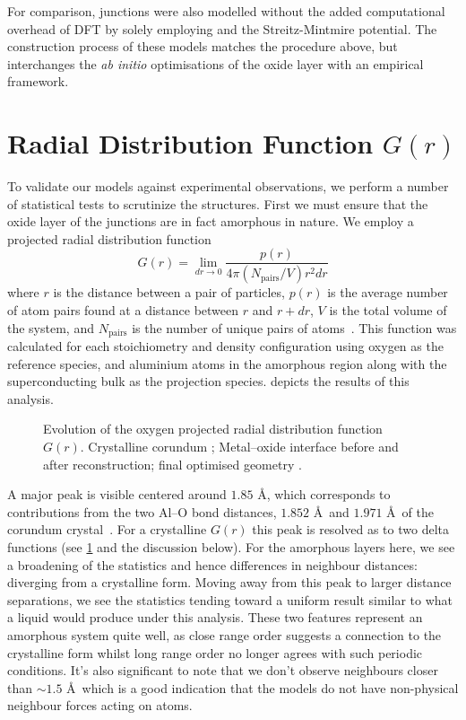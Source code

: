 For comparison, junctions were also modelled without the added computational overhead of DFT by solely employing  and the Streitz-Mintmire potential.
The construction process of these models matches the procedure above, but interchanges the \textit{ab initio} optimisations of the oxide layer with an empirical framework.

\section{Radial Distribution Function \texorpdfstring{$G(r)$}{G(r)}}\label{sec:gr}
To validate our models against experimental observations, we perform a number of statistical tests to scrutinize the structures.
First we must ensure that the oxide layer of the junctions are in fact amorphous in nature.
We employ a projected radial distribution function
\begin{equation}
G(r) = \lim_{dr \to 0}\frac{p(r)}{4\pi\left(N_{\mathrm{pairs}}/V\right)r^2dr}
\end{equation}
where $r$ is the distance between a pair of particles, $p(r)$ is the average number of atom pairs found at a distance between $r$ and $r + dr$, $V$ is the total volume of the system, and $N_{\mathrm{pairs}}$ is the number of unique pairs of atoms~\cite{Levine2011}.
This function was calculated for each stoichiometry and density configuration using oxygen as the reference species, and aluminium atoms in the amorphous region along with the superconducting bulk as the projection species.  depicts the results of this analysis.

\begin{figure}[htp]
\resizebox{0.8\textwidth}{!}{}
\caption[Radial Distribution Function]{\label{fig:groptis}Evolution of the oxygen projected radial distribution function $G(r)$. Crystalline corundum ; Metal--oxide interface before  and after  reconstruction; final optimised geometry .}%
\end{figure}

A major peak is visible centered around $1.85$ \AA, which corresponds to contributions from the two Al--O bond distances, $1.852$ \AA\ and $1.971$ \AA\ of the corundum crystal~\cite{Ishizawa1980}.
For a crystalline $G(r)$ this peak is resolved as to two delta functions (see \cref{fig:groptis} and the discussion below). 
For the amorphous layers here, we see a broadening of the statistics and hence differences in neighbour distances: diverging from a crystalline form.
Moving away from this peak to larger distance separations, we see the statistics tending toward a uniform result similar to what a liquid would produce under this analysis.
These two features represent an amorphous system quite well, as close range order suggests a connection to the crystalline form whilst long range order no longer agrees with such periodic conditions.
It's also significant to note that we don't observe neighbours closer than $\sim\!1.5$ \AA\ which is a good indication that the models do not have non-physical neighbour forces acting on atoms.

